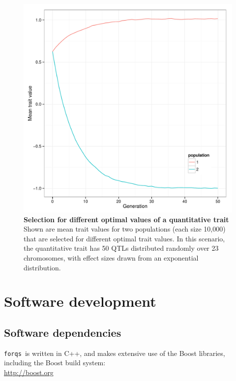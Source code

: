 \documentclass{article}
\newcommand{\forqs}[0]{\texttt{forqs }}
\begin{document}
\begin{figure}[H]
    \begin{center}
        \includegraphics[width=.9\textwidth]{fig/qtl_random_full_human_genome_mean_trait_values.pdf}
    \end{center}
    \caption{{\bf Selection for different optimal values of a quantitative trait} Shown are
             mean trait values for two populations (each size 10,000) that are selected for different
             optimal trait values.  In this scenario, the quantitative trait has 50 QTLs
             distributed randomly over 23 chromosomes, with effect sizes drawn from an
             exponential distribution.
            }
    \label{figure_full_human_genome}
\end{figure}



\newpage


\section{Software development}

\subsection{Software dependencies}

\forqs is written in C++, and makes extensive use of the Boost libraries, including
the Boost build system:\\
\url{http://boost.org}
\end{document}

